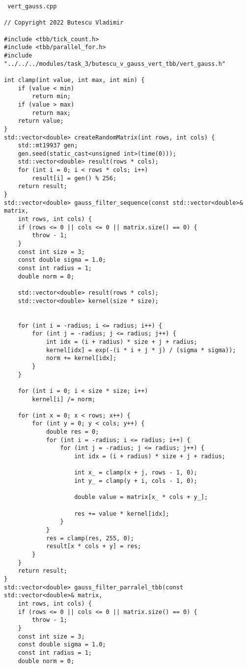 \documentclass{report}
\begin{document}
\begin{lstlisting}
 vert_gauss.cpp
 
// Copyright 2022 Butescu Vladimir

#include <tbb/tick_count.h>
#include <tbb/parallel_for.h>
#include "../../../modules/task_3/butescu_v_gauss_vert_tbb/vert_gauss.h"

int clamp(int value, int max, int min) {
    if (value < min)
        return min;
    if (value > max)
        return max;
    return value;
}
std::vector<double> createRandomMatrix(int rows, int cols) {
    std::mt19937 gen;
    gen.seed(static_cast<unsigned int>(time(0)));
    std::vector<double> result(rows * cols);
    for (int i = 0; i < rows * cols; i++)
        result[i] = gen() % 256;
    return result;
}
std::vector<double> gauss_filter_sequence(const std::vector<double>& matrix,
    int rows, int cols) {
    if (rows <= 0 || cols <= 0 || matrix.size() == 0) {
        throw - 1;
    }
    const int size = 3;
    const double sigma = 1.0;
    const int radius = 1;
    double norm = 0;

    std::vector<double> result(rows * cols);
    std::vector<double> kernel(size * size);


    for (int i = -radius; i <= radius; i++) {
        for (int j = -radius; j <= radius; j++) {
            int idx = (i + radius) * size + j + radius;
            kernel[idx] = exp(-(i * i + j * j) / (sigma * sigma));
            norm += kernel[idx];
        }
    }

    for (int i = 0; i < size * size; i++)
        kernel[i] /= norm;

    for (int x = 0; x < rows; x++) {
        for (int y = 0; y < cols; y++) {
            double res = 0;
            for (int i = -radius; i <= radius; i++) {
                for (int j = -radius; j <= radius; j++) {
                    int idx = (i + radius) * size + j + radius;

                    int x_ = clamp(x + j, rows - 1, 0);
                    int y_ = clamp(y + i, cols - 1, 0);

                    double value = matrix[x_ * cols + y_];

                    res += value * kernel[idx];
                }
            }
            res = clamp(res, 255, 0);
            result[x * cols + y] = res;
        }
    }
    return result;
}
std::vector<double> gauss_filter_parralel_tbb(const std::vector<double>& matrix,
    int rows, int cols) {
    if (rows <= 0 || cols <= 0 || matrix.size() == 0) {
        throw - 1;
    }
    const int size = 3;
    const double sigma = 1.0;
    const int radius = 1;
    double norm = 0;



\end{lstlisting}
\end{document}

